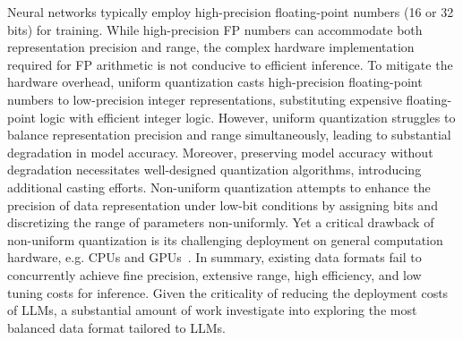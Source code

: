Neural networks typically employ high-precision floating-point numbers (16 or 32 bits) for training. While high-precision FP numbers can accommodate both representation precision and range, the complex hardware implementation required for FP arithmetic is not conducive to efficient inference.
To mitigate the hardware overhead, uniform quantization casts high-precision floating-point numbers to low-precision integer representations, substituting expensive floating-point logic with efficient integer logic. However, uniform quantization struggles to balance representation precision and range simultaneously, leading to substantial degradation in model accuracy. 
Moreover, preserving model accuracy without degradation necessitates well-designed quantization algorithms, introducing additional casting efforts.
Non-uniform quantization attempts to enhance the precision of data representation under low-bit conditions by assigning bits and discretizing the range of parameters non-uniformly. Yet a critical drawback of non-uniform quantization is its challenging deployment on general computation hardware, e.g. CPUs and GPUs~\citep{gholami2022survey}.
In summary, existing data formats fail to concurrently achieve fine precision, extensive range, high efficiency, and low tuning costs for inference.
Given the criticality of reducing the deployment costs of LLMs, a substantial amount of work investigate into exploring the most balanced data format tailored to LLMs.

